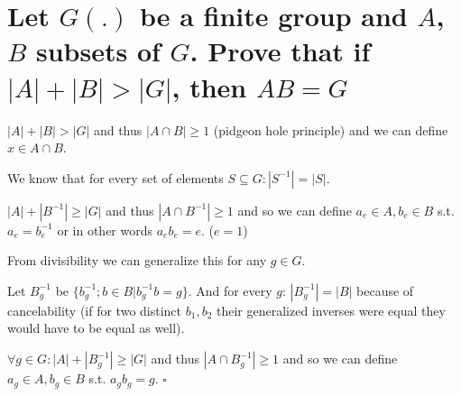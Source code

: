 \documentclass[11pt]{article}
\begin{document}
    \part*{Let $G(.)$ be a finite group and $A$, $B$ subsets of $G$.
    Prove that if $|A|+|B|>|G|$, then $AB = G$}

    $|A| + |B| > |G|$ and thus $|A \cap B| \geq 1$ (pidgeon hole principle) and we can define $x \in A \cap B$.

    We know that for every set of elements $S \subseteq G: |S^{-1}| = |S|$.

    $|A| + |B^{-1}| \geq |G|$ and thus $|A \cap B^{-1}| \geq 1$ and so we can define $a_e \in A, b_e \in B$ s.t. $a_e = b_e^{-1}$ or in other words $a_e b_e = e$. ($e = 1$)
    
    From divisibility we can generalize this for any $g \in G$.

    Let $B_g^{-1}$ be $\{b_g^{-1} ; b \in B | b_g^{-1} b = g\}$. And for every $g$: $|B_g^{-1}| = |B|$ because of cancelability (if for two distinct $b_1, b_2$ their generalized inverses were equal they would have to be equal as well).

    $\forall g \in G: |A| + |B_g^{-1}| \geq |G|$ and thus $|A \cap B_g^{-1}| \geq 1$ and so we can define $a_g \in A, b_g \in B$ s.t. $a_g b_g = g$. $\square$
\end{document}
